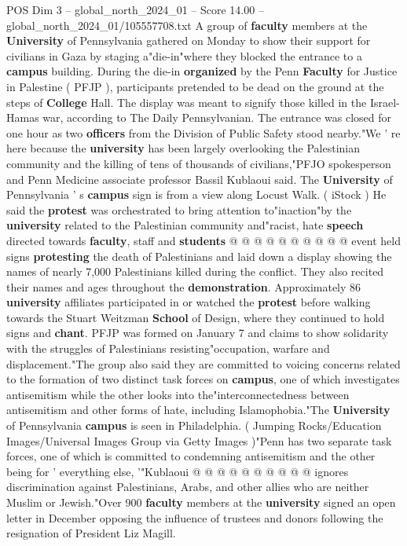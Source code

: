 \begin{textsample}{POS Dim 3 – global\_north\_2024\_01 – Score 14.00 – global\_north\_2024\_01/105557708.txt}  \label{ex:f3_pos_221}
A group of \textbf{faculty} members at the \textbf{University} of Pennsylvania gathered on Monday to show their support for civilians in Gaza by staging a"die-in"where they blocked the entrance to a \textbf{campus} building.
During the die-in \textbf{organized} by the Penn \textbf{Faculty} for Justice in Palestine ( PFJP ), participants pretended to be dead on the ground at the steps of \textbf{College} Hall.
The display was meant to signify those killed in the Israel-Hamas war, according to The Daily Pennsylvanian.
The entrance was closed for one hour as two \textbf{officers} from the Division of Public Safety stood nearby."We ' re here because the \textbf{university} has been largely overlooking the Palestinian community and the killing of tens of thousands of civilians,"PFJO spokesperson and Penn Medicine associate professor Bassil Kublaoui said.
The \textbf{University} of Pennsylvania ' s \textbf{campus} sign is from a view along Locust Walk. ( iStock ) He said the \textbf{protest} was orchestrated to bring attention to"inaction"by the \textbf{university} related to the Palestinian community and"racist, hate \textbf{speech} directed towards \textbf{faculty}, staff and \textbf{students} @ @ @ @ @ @ @ @ @ @ event held signs \textbf{protesting} the death of Palestinians and laid down a display showing the names of nearly 7,000 Palestinians killed during the conflict.
They also recited their names and ages throughout the \textbf{demonstration}.
Approximately 86 \textbf{university} affiliates participated in or watched the \textbf{protest} before walking towards the Stuart Weitzman \textbf{School} of Design, where they continued to hold signs and \textbf{chant}.
PFJP was formed on January 7 and claims to show solidarity with the struggles of Palestinians resisting"occupation, warfare and displacement."The group also said they are committed to voicing concerns related to the formation of two distinct task forces on \textbf{campus}, one of which investigates antisemitism while the other looks into the"interconnectedness between antisemitism and other forms of hate, including Islamophobia."The \textbf{University} of Pennsylvania \textbf{campus} is seen in Philadelphia. ( Jumping Rocks/Education Images/Universal Images Group via Getty Images )"Penn has two separate task forces, one of which is committed to condemning antisemitism and the other being for ' everything else, '"Kublaoui @ @ @ @ @ @ @ @ @ @ ignores discrimination against Palestinians, Arabs, and other allies who are neither Muslim or Jewish."Over 900 \textbf{faculty} members at the \textbf{university} signed an open letter in December opposing the influence of trustees and donors following the resignation of President Liz Magill.

\end{textsample}
